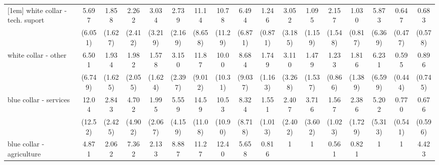 {\begin{tabular}{l*{16}{c}}
[1em]
white collar - tech. suport&       5.697         &       1.858         &       2.262         &       3.034         &       2.739         &       11.14\sym{**} &       10.78\sym{*}  &       6.494         &       1.246         &       3.052         &       1.095         &       2.157         &       1.030         &       5.873         &       0.647         &       0.683         \\
                    &     (6.051)         &     (1.627)         &     (2.412)         &     (3.219)         &     (2.169)         &     (8.658)         &     (11.29)         &     (6.871)         &     (0.871)         &     (3.185)         &     (1.159)         &     (1.548)         &     (0.817)         &     (6.369)         &     (0.477)         &     (0.578)         \\
[1em]
white collar - other&       6.501         &       1.934         &       1.982         &       1.578         &       3.150         &       11.87\sym{**} &       10.00\sym{*}  &       8.684\sym{*}  &       1.749         &       3.110         &       1.479         &       1.233         &       1.816         &       6.231         &       0.595         &       0.896         \\
                    &     (6.749)         &     (1.625)         &     (2.055)         &     (1.624)         &     (2.397)         &     (9.012)         &     (10.31)         &     (9.037)         &     (1.163)         &     (3.268)         &     (1.537)         &     (0.866)         &     (1.389)         &     (6.599)         &     (0.444)         &     (0.745)         \\
[1em]
blue collar - services&       12.04\sym{*}  &       2.843         &       4.702         &       1.995         &       5.559\sym{*}  &       14.59\sym{***}&       10.53\sym{*}  &       8.324\sym{*}  &       1.551         &       2.407         &       3.716         &       1.567         &       2.386         &       5.202         &       0.770         &       0.676         \\
                    &     (12.52)         &     (2.425)         &     (4.902)         &     (2.067)         &     (4.159)         &     (11.08)         &     (10.90)         &     (8.718)         &     (1.013)         &     (2.402)         &     (3.602)         &     (1.023)         &     (1.729)         &     (5.313)         &     (0.541)         &     (0.596)         \\
[1em]
blue collar - agriculture&       4.871         &       2.062         &       7.362         &       2.133         &       8.887         &       11.27\sym{*}  &       12.40         &       5.658         &       0.816         &           1         &           1         &       0.561         &       0.821         &           1         &           1         &       4.423         \\

\end{tabular}}
